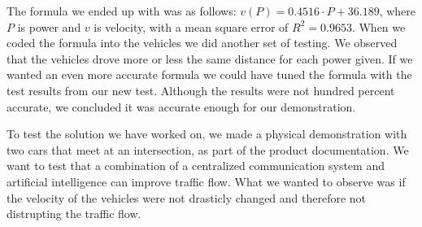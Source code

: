 The formula we ended up with was as follows: $v(P) = 0.4516\cdot P + 36.189$, where $P$ is power and $v$ is velocity, with a mean square error of $R^2=0.9653$. When we coded the formula into the vehicles we did another set of testing. We observed that the vehicles drove more or less the same distance for each power given. If we wanted an even more accurate formula we could have tuned the formula with the test results from our new test. Although the results were not hundred percent accurate, we concluded it was accurate enough for our demonstration. 

To test the solution we have worked on, we made a physical demonstration with two cars that meet at an intersection, as part of the product documentation. We want to test that a combination of a centralized communication system and artificial intelligence can improve traffic flow. What we wanted to observe was if the velocity of the vehicles were not drasticly changed and therefore not distrupting the traffic flow.

